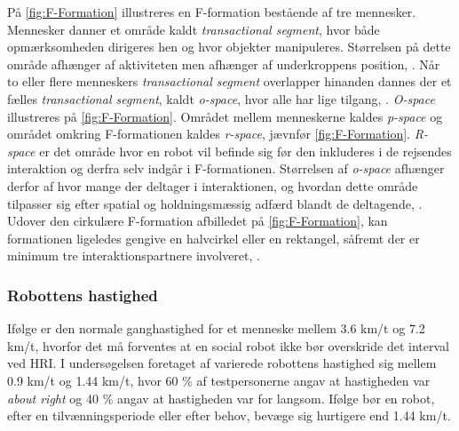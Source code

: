På \autoref{fig:F-Formation} illustreres en F-formation bestående af tre mennesker. Mennesker danner et område kaldt \textit{transactional segment}, hvor både opmærksomheden dirigeres hen og hvor objekter manipuleres. Størrelsen på dette område afhænger af aktiviteten men afhænger af underkroppens position, \parencite[s. 446]{PDF:UsingFFormations}. Når to eller flere menneskers \textit{transactional segment} overlapper hinanden dannes der et fælles \textit{transactional segment}, kaldt \textit{o-space}, hvor alle har lige tilgang, \parencite[s. 446]{PDF:UsingFFormations}. \textit{O-space} illustreres på \autoref{fig:F-Formation}. Området mellem menneskerne kaldes \textit{p-space} og området omkring F-formationen kaldes \textit{r-space}, jævnfør \autoref{fig:F-Formation}. \textit{R-space} er det område hvor en robot vil befinde sig før den inkluderes i de rejsendes interaktion og derfra selv indgår i F-formationen. Størrelsen af \textit{o-space} afhænger derfor af hvor mange der deltager i interaktionen, og hvordan dette område tilpasser sig efter spatial og holdningsmæssig adfærd blandt de deltagende, \parencite[s. 446]{PDF:UsingFFormations}. Udover den cirkulære F-formation afbilledet på \autoref{fig:F-Formation}, kan formationen ligeledes gengive en halvcirkel eller en rektangel, såfremt der er minimum tre interaktionspartnere involveret, \parencite[s. 446]{PDF:UsingFFormations}.   
%

\subsubsection*{Robottens hastighed}
\label{InteraktionSocialeRobotterParametreBevaegelsesmoenstreHastighed}
%
Ifølge \textcite[s. 165]{PDF:HumanRobotEmodiedInteraction} er den normale ganghastighed for et menneske mellem 3.6 km/t og 7.2 km/t, hvorfor det må forventes at en social robot ikke bør overskride det interval ved HRI. I undersøgelsen foretaget af \textcite[s. 175]{PDF:HowMayIServeYou} varierede robottens hastighed sig mellem 0.9 km/t og 1.44 km/t, hvor 60 \% af testpersonerne angav at hastigheden var \textit{about right} og 40 \% angav at hastigheden var for langsom. Ifølge \textcite[s. 178]{PDF:HowMayIServeYou} bør en robot, efter en tilvænningsperiode eller efter behov, bevæge sig hurtigere end 1.44 km/t. 

